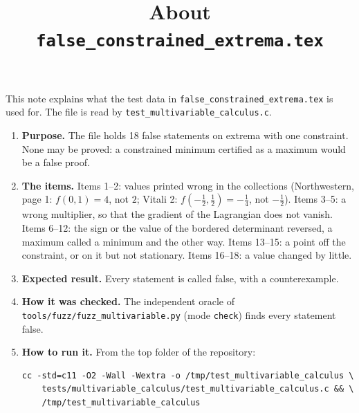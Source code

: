 \documentclass[11pt,a4paper]{article}
\title{About \texttt{false\_constrained\_extrema.tex}}
\author{}
\date{}
\begin{document}
\maketitle
This note explains what the test data in \texttt{false\_constrained\_extrema.tex} is used for. The file is read by \texttt{test\_multivariable\_calculus.c}.

\begin{enumerate}
\item \textbf{Purpose.} The file holds 18 false statements on extrema with one constraint. None may be proved: a constrained minimum certified as a maximum would be a false proof.

\item \textbf{The items.} Items 1--2: values printed wrong in the collections (Northwestern, page 1: $f(0, 1) = 4$, not $2$; Vitali 2: $f(-\frac{1}{2}, \frac{1}{2}) = -\frac{1}{4}$, not $-\frac{1}{2}$). Items 3--5: a wrong multiplier, so that the gradient of the Lagrangian does not vanish. Items 6--12: the sign or the value of the bordered determinant reversed, a maximum called a minimum and the other way. Items 13--15: a point off the constraint, or on it but not stationary. Items 16--18: a value changed by little.

\item \textbf{Expected result.} Every statement is called false, with a counterexample.

\item \textbf{How it was checked.} The independent oracle of \texttt{tools/fuzz/fuzz\_multivariable.py} (mode \texttt{check}) finds every statement false.

\item \textbf{How to run it.} From the top folder of the repository:
\begin{verbatim}
cc -std=c11 -O2 -Wall -Wextra -o /tmp/test_multivariable_calculus \
    tests/multivariable_calculus/test_multivariable_calculus.c && \
    /tmp/test_multivariable_calculus
\end{verbatim}
\end{enumerate}
\end{document}
